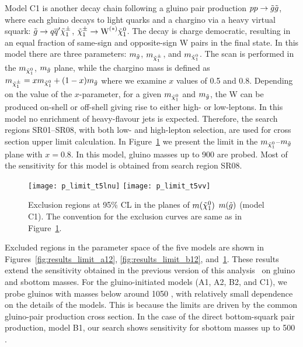 Model C1 is another decay chain following a gluino pair production
$\relax{p}\relax{p}\to\tilde{\relax{g}}\tilde{\relax{g}}$, where each gluino decays to light quarks and a
chargino via a heavy virtual squark: $\tilde{\relax{g}}\to\relax{q}\relax{\overline{q}}'\tilde{\chi}^{\pm}_1$, $\tilde{\chi}^{\pm}_1
\to \text{W}^{(*)}\tilde{\chi}^{0}_1$. The decay is charge democratic, resulting in an
equal fraction of same-sign and opposite-sign W pairs in the final state.
In this model there are three parameters: $m_{\tilde{\relax{g}}}$, $m_{\tilde{\chi}^{\pm}_1}$, and
$m_{\tilde{\chi}^{0}_1}$. The scan is performed in the $m_{\tilde{\chi}^{0}_1}$, $m_{\tilde{\relax{g}}}$
plane, while the chargino mass is defined as $m_{\tilde{\chi}^{\pm}_1} = xm_{\tilde{\chi}^{0}_1}
+ (1-x)m_{\tilde{\relax{g}}}$ where we examine $x$ values of 0.5 and 0.8. Depending on
the value of the $x$-parameter, for a given $m_{\tilde{\chi}^{0}_1}$ and $m_{\tilde{\relax{g}}}$,
the W can be produced on-shell or off-shell giving rise to either high-
or low-\pt leptons. In this model no enrichment of heavy-flavour jets
is expected. Therefore, the search regions SR01--SR08, with both low-
and high-\pt lepton selection, are used for cross section upper limit
calculation. In Figure~\ref{fig:results_limit_c1} we present the limit in the
$m_{\tilde{\chi}^{0}_1}$--$m_{\tilde{\relax{g}}}$ plane with $x=0.8$. In this model, gluino masses up
to 900 \GeV are probed. Most of the sensitivity for this model is obtained from
search region SR08.
\begin{figure}[!htb]
\begin{center}
\texttt{[image: p\_limit\_t5lnu]}
\texttt{[image: p\_limit\_t5vv]}
\caption[Exclusion curves for model C1]
{\label{fig:results_limit_c1}
Exclusion regions at 95\% CL in the planes of $m(\tilde{\chi}^{0}_1)$ \vs $m(\tilde{\relax{g}})$
(model C1). The convention for the exclusion curves are same as in
Figure~\ref{fig:results_limit_c1}.
}
\end{center}
\end{figure}

Excluded regions in the parameter space of the five models are shown
in Figures~\ref{fig:results_limit_a12}, \ref{fig:results_limit_b12},
and~\ref{fig:results_limit_c1}. These results extend the sensitivity obtained
in the previous version of this analysis~\cite{sspaper2012} on gluino and
sbottom masses. For the gluino-initiated models (A1, A2, B2, and C1), we probe
gluinos with masses below around 1050 \GeV, with relatively small dependence on
the details of the models. This is because the limits are driven by the common
gluino-pair production cross section. In the case of the direct bottom-squark
pair production, model B1, our search shows sensitivity for sbottom masses up
to 500 \GeV.

